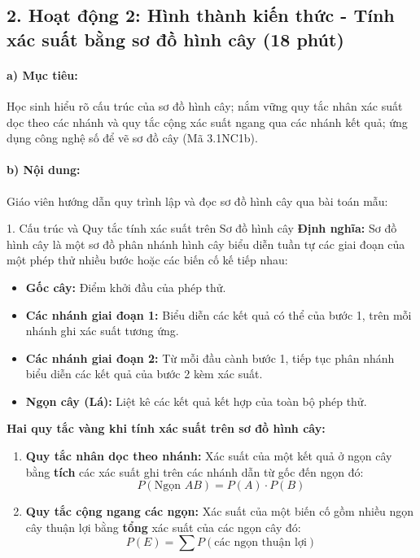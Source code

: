 \documentclass[12pt, a4paper]{article}
\begin{document}
\subsection*{2. Hoạt động 2: Hình thành kiến thức - Tính xác suất bằng sơ đồ hình cây (18 phút)}

\paragraph{a) Mục tiêu:} Học sinh hiểu rõ cấu trúc của sơ đồ hình cây; nắm vững quy tắc nhân xác suất dọc theo các nhánh và quy tắc cộng xác suất ngang qua các nhánh kết quả; ứng dụng công nghệ số để vẽ sơ đồ cây (Mã 3.1NC1b).

\paragraph{b) Nội dung:} Giáo viên hướng dẫn quy trình lập và đọc sơ đồ hình cây qua bài toán mẫu:

\begin{pedabox}{1. Cấu trúc và Quy tắc tính xác suất trên Sơ đồ hình cây}
\textbf{Định nghĩa:} Sơ đồ hình cây là một sơ đồ phân nhánh hình cây biểu diễn tuần tự các giai đoạn của một phép thử nhiều bước hoặc các biến cố kế tiếp nhau:
\begin{itemize}[leftmargin=0.5cm]
    \item \textbf{Gốc cây:} Điểm khởi đầu của phép thử.
    \item \textbf{Các nhánh giai đoạn 1:} Biểu diễn các kết quả có thể của bước 1, trên mỗi nhánh ghi xác suất tương ứng.
    \item \textbf{Các nhánh giai đoạn 2:} Từ mỗi đầu cành bước 1, tiếp tục phân nhánh biểu diễn các kết quả của bước 2 kèm xác suất.
    \item \textbf{Ngọn cây (Lá):} Liệt kê các kết quả kết hợp của toàn bộ phép thử.
\end{itemize}
\textbf{Hai quy tắc vàng khi tính xác suất trên sơ đồ hình cây:}
\begin{enumerate}[leftmargin=0.6cm]
    \item \textbf{Quy tắc nhân dọc theo nhánh:} Xác suất của một kết quả ở ngọn cây bằng \textbf{tích} các xác suất ghi trên các nhánh dẫn từ gốc đến ngọn đó:
    $$P(\text{Ngọn } AB) = P(A) \cdot P(B)$$
    \item \textbf{Quy tắc cộng ngang các ngọn:} Xác suất của một biến cố gồm nhiều ngọn cây thuận lợi bằng \textbf{tổng} xác suất của các ngọn cây đó:
    $$P(E) = \sum P(\text{các ngọn thuận lợi})$$
\end{enumerate}
\end{pedabox}
\end{document}
